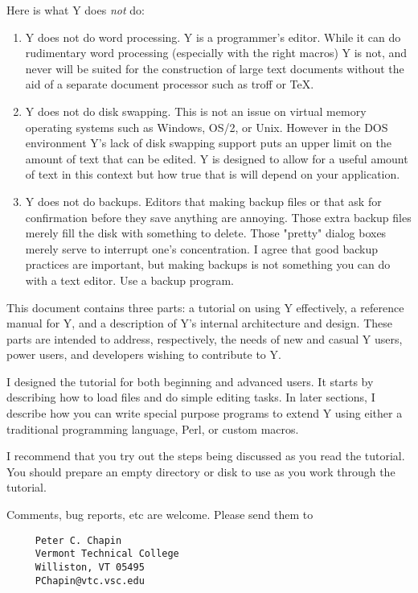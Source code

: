 Here is what Y does \emph{not} do:

\begin{enumerate}

\item Y does not do word processing. Y is a programmer's editor. While it can do rudimentary
  word processing (especially with the right macros) Y is not, and never will be suited for the
  construction of large text documents without the aid of a separate document processor such as
  troff or \TeX.

\item Y does not do disk swapping. This is not an issue on virtual memory operating systems such
  as Windows, OS/2, or Unix. However in the DOS environment Y's lack of disk swapping support
  puts an upper limit on the amount of text that can be edited. Y is designed to allow for a
  useful amount of text in this context but how true that is will depend on your application.

\item Y does not do backups. Editors that making backup files or that ask for confirmation
  before they save anything are annoying. Those extra backup files merely fill the disk with
  something to delete. Those "pretty" dialog boxes merely serve to interrupt one's
  concentration. I agree that good backup practices are important, but making backups is not
  something you can do with a text editor. Use a backup program.

\end{enumerate}

This document contains three parts: a tutorial on using Y effectively, a reference manual for Y,
and a description of Y's internal architecture and design. These parts are intended to address,
respectively, the needs of new and casual Y users, power users, and developers wishing to
contribute to Y.

I designed the tutorial for both beginning and advanced users. It starts by describing how to
load files and do simple editing tasks. In later sections, I describe how you can write special
purpose programs to extend Y using either a traditional programming language, Perl, or custom
macros.

I recommend that you try out the steps being discussed as you read the tutorial. You should
prepare an empty directory or disk to use as you work through the tutorial.

Comments, bug reports, etc are welcome. Please send them to

\begin{verbatim}
     Peter C. Chapin
     Vermont Technical College
     Williston, VT 05495
     PChapin@vtc.vsc.edu
\end{verbatim}

